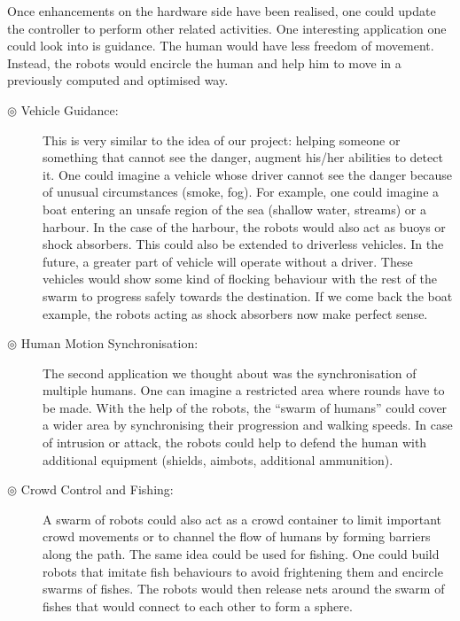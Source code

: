 \documentclass[oneside, a4paper, 12pt]{memoir}
\begin{document}
			Once enhancements on the hardware side have been realised, one could update the controller to perform other related activities. One interesting application one could look into is guidance. The human would have less freedom of movement. Instead, the robots would encircle the human and help him to move in a previously computed and optimised way.
			\begin{description}
				\item[$\circledcirc$ Vehicle Guidance:] This is very similar to the idea of our project: helping someone or something that cannot see the danger, augment his/her abilities to detect it. One could imagine a vehicle whose driver cannot see the danger because of unusual circumstances (smoke, fog). For example, one could imagine a boat entering an unsafe region of the sea (shallow water, streams) or a harbour. In the case of the harbour, the robots would also act as buoys or shock absorbers. This could also be extended to driverless vehicles. In the future, a greater part of vehicle will operate without a driver. These vehicles would show some kind of flocking behaviour with the rest of the swarm to progress safely towards the destination. If we come back the boat example, the robots acting as shock absorbers now make perfect sense.
				
				\item[$\circledcirc$ Human Motion Synchronisation:] The second application we thought about was the synchronisation of multiple humans. One can imagine a restricted area where rounds have to be made. With the help of the robots, the \enquote{swarm of humans} could cover a wider area by synchronising their progression and walking speeds. In case of intrusion or attack, the robots could help to defend the human with additional equipment (shields, aimbots, additional ammunition).
				
				\item[$\circledcirc$ Crowd Control and Fishing:] A swarm of robots could also act as a crowd container to limit important crowd movements or to channel the flow of humans by forming barriers along the path. The same idea could be used for fishing. One could build robots that imitate fish behaviours to avoid frightening them and encircle swarms of fishes. The robots would then release nets around the swarm of fishes that would connect to each other to form a sphere.
			\end{description}
			
\end{document}
